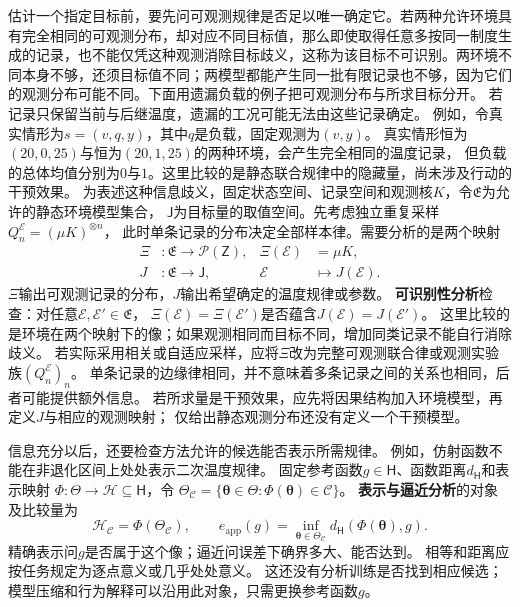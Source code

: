估计一个指定目标前，要先问可观测规律是否足以唯一确定它。若两种允许环境具有完全相同的可观测分布，却对应不同目标值，那么即使取得任意多按同一制度生成的记录，也不能仅凭这种观测消除目标歧义，这称为该目标不可识别。两环境不同本身不够，还须目标值不同；两模型都能产生同一批有限记录也不够，因为它们的观测分布可能不同。下面用遗漏负载的例子把可观测分布与所求目标分开。
若记录只保留当前与后继温度，遗漏的工况可能无法由这些记录确定。
例如，令真实情形为$s=(v,q,y)$，其中$q$是负载，固定观测为$(v,y)$。
真实情形恒为$(20,0,25)$与恒为$(20,1,25)$的两种环境，会产生完全相同的温度记录，
但负载的总体均值分别为$0$与$1$。这里比较的是静态联合规律中的隐藏量，尚未涉及行动的干预效果。
为表述这种信息歧义，固定状态空间、记录空间和观测核$K$，令$\mathfrak E$为允许的静态环境模型集合，
$\mathsf J$为目标量的取值空间。先考虑独立重复采样$Q_n^{\mathcal E}=(\mu K)^{\otimes n}$，
此时单条记录的分布决定全部样本律。需要分析的是两个映射
\begin{equation}
  \begin{aligned}
    \Xi&:\mathfrak E\to\mathcal P(\mathsf Z),
      &\Xi(\mathcal E)&=\mu K,\\
    J&:\mathfrak E\to\mathsf J,
      &\mathcal E&\mapsto J(\mathcal E).
  \end{aligned}
  \label{eq:future-task-observation-target-maps}
\end{equation}
$\Xi$输出可观测记录的分布，$J$输出希望确定的温度规律或参数。
\textbf{可识别性分析}检查：对任意$\mathcal E,\mathcal E'\in\mathfrak E$，
$\Xi(\mathcal E)=\Xi(\mathcal E')$是否蕴含$J(\mathcal E)=J(\mathcal E')$。
这里比较的是环境在两个映射下的像；如果观测相同而目标不同，增加同类记录不能自行消除歧义。
若实际采用相关或自适应采样，应将$\Xi$改为完整可观测联合律或观测实验族$(Q_n^{\mathcal E})_n$。
单条记录的边缘律相同，并不意味着多条记录之间的关系也相同，后者可能提供额外信息。
若所求量是干预效果，应先将因果结构加入环境模型，再定义$J$与相应的观测映射；
仅给出静态观测分布还没有定义一个干预模型。

信息充分以后，还要检查方法允许的候选能否表示所需规律。
例如，仿射函数不能在非退化区间上处处表示二次温度规律。
固定参考函数$g\in\mathsf H$、函数距离$d_{\mathsf H}$和表示映射
$\Phi:\Theta\to\mathcal H\subseteq\mathsf H$，令
$\Theta_{\mathcal C}=\{\bm\theta\in\Theta:\Phi(\bm\theta)\in\mathcal C\}$。
\textbf{表示与逼近分析}的对象及比较量为
\[
  \mathcal H_{\mathcal C}=\Phi(\Theta_{\mathcal C}),\qquad
  e_{\mathrm{app}}(g)=
  \inf_{\bm\theta\in\Theta_{\mathcal C}}
       d_{\mathsf H}(\Phi(\bm\theta),g).
\]
精确表示问$g$是否属于这个像；逼近问误差下确界多大、能否达到。
相等和距离应按任务规定为逐点意义或几乎处处意义。
这还没有分析训练是否找到相应候选；模型压缩和行为解释可以沿用此对象，只需更换参考函数$g$。

